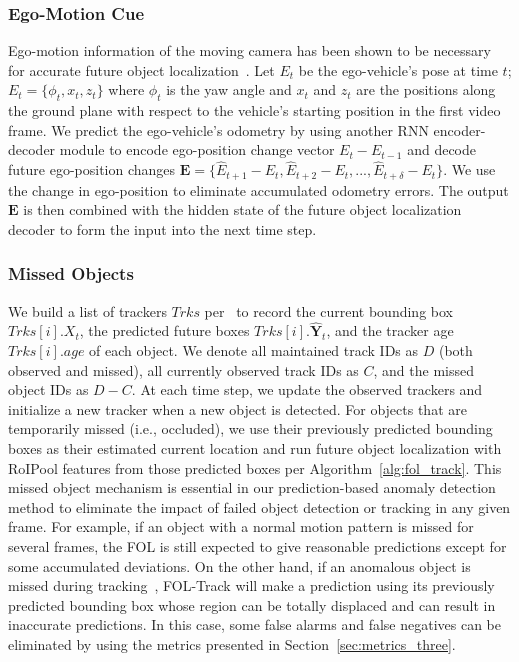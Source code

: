 \documentclass[letterpaper, 10 pt, conference]{ieeeconf}
\theoremstyle{definition}
\theoremstyle{remark}
\begin{document}
\subsubsection{Ego-Motion Cue}
Ego-motion information of the moving camera has been shown
to be necessary for accurate future object localization~\cite{yao2018egocentric,Bhattacharyya_2018_CVPR}.
Let $E_t$ be the ego-vehicle's pose at time $t$;
$E_t=\{\phi_t,x_t,z_t\}$ where $\phi_t$ is the yaw angle and $x_t$
and $z_t$ are the positions along the ground plane with respect to the
vehicle's starting position in the first video frame.
We predict the ego-vehicle's odometry by using another RNN 
encoder-decoder module to encode  ego-position
change vector $E_t-E_{t-1}$ and decode future ego-position changes
$\mathbf{E}=\{\hat{E}_{t+1}-E_{t},\hat{E}_{t+2}-E_{t},...,\hat{E}_{t+\delta}-E_{t}\}$.
We use the change in ego-position 
to eliminate accumulated odometry errors. 
The output $\mathbf{E}$ is then combined with the hidden state of the
future object localization decoder to form the input into the next time step.

\subsubsection{Missed Objects}
We build a list of trackers $Trks$ per~\cite{wojke2017simple} to 
record the current bounding box
$Trks[i].X_t$, the predicted future boxes $Trks[i].\mathbf{\hat{Y}}_t$, 
and the tracker
age $Trks[i].age$ of each object. 
We denote all maintained track IDs as $D$ (both observed 
and missed), all currently observed track IDs as $C$, and the 
missed object IDs as $D-C$.
At each time step, we
update the observed trackers and initialize a new tracker when a new object
is detected.  For objects that are temporarily missed (i.e., occluded), 
we use their previously predicted bounding boxes as
their estimated current location and run future object localization 
with RoIPool features
from those predicted boxes per Algorithm~\ref{alg:fol_track}. 
This missed object mechanism is essential in our prediction-based
anomaly detection method to eliminate the impact of failed object
detection or tracking in any given frame. For example, if an object with a normal motion
pattern is missed for several frames, the FOL is still expected to
give reasonable predictions except for some accumulated deviations. On the
other hand, if an anomalous object is missed during tracking~\cite{wojke2017simple}, 
FOL-Track will make a prediction using its previously
predicted bounding box whose region can be totally displaced and can
result in inaccurate predictions. In this case, some false alarms and false
negatives can be eliminated by using the metrics presented in
Section~\ref{sec:metrics_three}.
\end{document}
